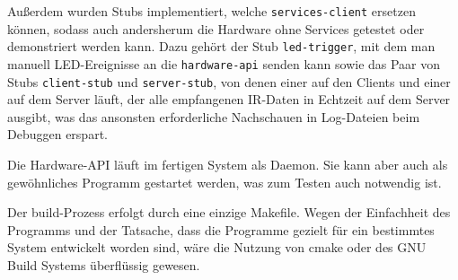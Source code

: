 \label{client-stub-und-server-stub}
Außerdem wurden Stubs implementiert, welche \texttt{services-client} ersetzen können, sodass auch
andersherum die Hardware ohne Services getestet oder demonstriert werden kann.
Dazu gehört der Stub \texttt{led-trigger}, mit dem man manuell LED-Ereignisse an die
\texttt{hardware-api} senden kann sowie das Paar von Stubs \texttt{client-stub} und
\texttt{server-stub}, von denen einer auf den Clients und einer auf dem Server läuft, der alle
empfangenen IR-Daten in Echtzeit auf dem Server ausgibt, was das ansonsten erforderliche
Nachschauen in Log-Dateien beim Debuggen erspart.

Die Hardware-API läuft im fertigen System als Daemon.
Sie kann aber auch als gewöhnliches Programm gestartet werden, was zum Testen auch notwendig ist.

Der build-Prozess erfolgt durch eine einzige Makefile.
Wegen der Einfachheit des Programms und der Tatsache, dass die Programme gezielt für ein bestimmtes
System entwickelt worden sind, wäre die Nutzung von cmake oder des GNU Build Systems überflüssig
gewesen.
